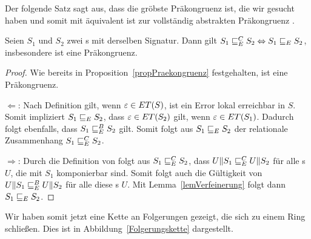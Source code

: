 Der folgende Satz sagt aus, dass \ERel{} die gröbste Präkongruenz ist, die wir
gesucht haben und somit mit äquivalent ist zur vollständig abstrakten
Präkongruenz \ECRel{}.

\begin{satz}
  \label{satzFullAbstractness}
  Seien $S_1$ und $S_2$ zwei \EIO{}s mit derselben Signatur. Dann gilt
  $S_1\sqsubseteq _E^C S_2\Leftrightarrow S_1\sqsubseteq _E S_2$, insbesondere ist \ERel{}
  eine Präkongruenz.
\end{satz}

\begin{proof}
  Wie bereits in Proposition~\ref{propPraekongruenz} festgehalten, ist \ERel{} eine
  Präkongruenz.

  \glqq $\Leftarrow$\grqq : Nach Definition gilt, wenn
      $\varepsilon\in ET{}(S)$, ist ein Error lokal erreichbar in $S$.
      Somit impliziert $S_1\sqsubseteq _E S_2$, dass $\varepsilon\in
      ET{}(S_2)$ gilt, wenn $\varepsilon\in ET{}(S_1)$. Dadurch folgt ebenfalls,
      dass $S_1\sqsubseteq _E^B S_2$ gilt. Somit folgt aus $S_1\sqsubseteq _E S_2$ der relationale
      Zusammenhang $S_1\sqsubseteq _E^C S_2$.

      \glqq $\Rightarrow$\grqq : Durch die Definition von \ECRel{} folgt aus
  $S_1\sqsubseteq _E^C S_2$, dass $U\|S_1\sqsubseteq _E^C U\|S_2$ für alle \EIO{}s $U$, die mit
  $S_1$ komponierbar sind. Somit folgt auch die Gültigkeit von
  $U\|S_1\sqsubseteq _E^B U\|S_2$ für alle diese \EIO{}s $U$. Mit
  Lemma~\ref{lemVerfeinerung} folgt dann $S_1\sqsubseteq _E S_2$.
\end{proof}

Wir haben somit jetzt eine Kette an Folgerungen gezeigt, die sich zu einem
Ring schließen. Dies ist in Abbildung~\ref{Folgerungskette} dargestellt.

